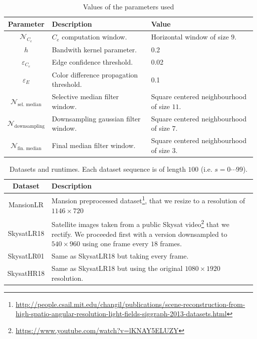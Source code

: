 \documentclass{article}
\theoremstyle{definition}
\begin{document}
\begin{table}[ht]
 \centering
 \begin{tabular}{|c|l|l|}
  \hline
  \textbf{Parameter} & \textbf{Description} & \textbf{Value}\\
  \hline \hline 
  $\mathcal{N}_{C_e}$ & $C_e$ computation window. &  Horizontal window of size $9$.\\
  \hline 
  $h$ & Bandwith kernel parameter. & 0.2 \\
  \hline 
  $\varepsilon_{C_e}$ & Edge confidence threshold. & 0.02 \\
  \hline 
  $\varepsilon_E$ & Color difference propagation threshold. & 0.1 \\
  \hline 
  $\mathcal{N}_\text{sel. median}$ & Selective median filter window. & Square centered neighbourhood of size $11$. \\
  \hline 
  $\mathcal{N}_\text{downsampling}$ & Downsampling gaussian filter window. & Square centered neighbourhood of size $7$.\\
  \hline 
  $\mathcal{N}_\text{fin. median}$ & Final median filter window. & Square centered neighbourhood of size $3$.\\
  \hline
 \end{tabular}
 \caption{Values of the parameters used}
 \label{table:parameters}
\end{table}

\begin{savenotes}
\begin{table}[ht]
 \centering
 \begin{tabular}{|c|p{10cm}|}
  \hline
  \textbf{Dataset} & \textbf{Description} \\
  \hline \hline 
  MansionLR & Mansion preprocessed dataset\footnote{\url{http://people.csail.mit.edu/changil/publications/scene-reconstruction-from-high-spatio-angular-resolution-light-fields-siggraph-2013-datasets.html}}, that we resize to a resolution of $1146\times 720$\\
  \hline 
  SkysatLR18 & Satellite images taken from a public Skysat video\footnote{\url{https://www.youtube.com/watch?v=lKNAY5ELUZY}} that we rectify. We proceeded first with a version downsampled to $540\times 960$ using one frame every $18$ frames.\\
  \hline 
  SkysatLR01 & Same as SkysatLR18 but taking every frame.\\
  \hline 
  SkysatHR18 & Same as SkysatLR18 but using the original $1080\times 1920$ resolution.\\
  \hline
 \end{tabular}
 \caption{Datasets and runtimes. Each dataset sequence is of length $100$ (i.e. $s=0\cdots 99$). }
 \label{table:datasets}
\end{table}
\end{savenotes}
\end{document}
